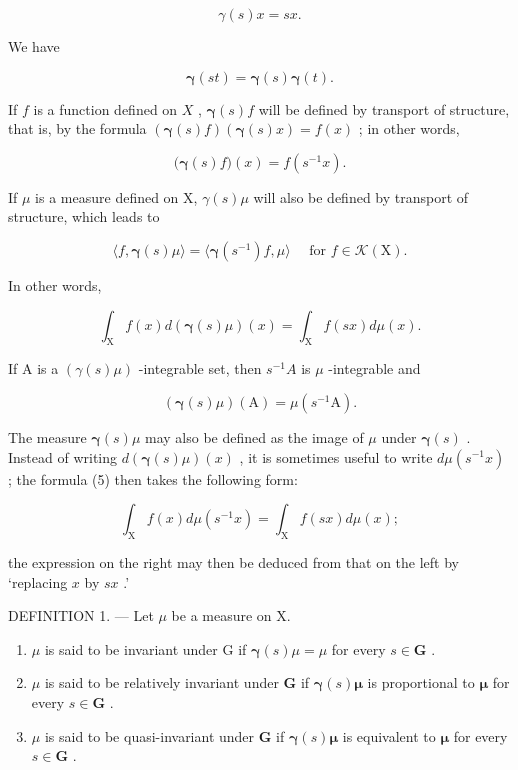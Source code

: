 \[
\gamma (s) x = s x.\tag{1}
\]

We have

\[
\boldsymbol {\gamma} (s t) = \boldsymbol {\gamma} (s) \boldsymbol {\gamma} (t).\tag{2}
\]

If \(f\) is a function defined on \(X\) , \(\boldsymbol{\gamma}(s)f\) will be defined by transport of structure, that is, by the formula \((\boldsymbol{\gamma}(s)f)(\boldsymbol{\gamma}(s)x) = f(x)\) ; in other words,

\[
\big (\boldsymbol {\gamma} (s) f \big) (x) = f (s ^ {- 1} x).\tag{3}
\]

If \(\mu\) is a measure defined on X, \(\gamma(s)\mu\) will also be defined by transport of structure, which leads to

\[
\langle f, \boldsymbol {\gamma} (s) \mu \rangle = \langle \boldsymbol {\gamma} (s ^ {- 1}) f, \mu \rangle \quad \text {   for   } f \in \mathscr {K} (\mathrm{X}).\tag{4}
\]

In other words,

\[
\int_ {\mathrm{X}} f (x) d (\boldsymbol {\gamma} (s) \mu) (x) = \int_ {\mathrm{X}} f (s x) d \mu (x).\tag{5}
\]

If A is a \((\gamma(s)\mu)\) -integrable set, then \(s^{-1}A\) is \(\mu\) -integrable and

\[
\left(\boldsymbol {\gamma} (s) \mu\right) (\mathrm{A}) = \mu \left(s ^ {- 1} \mathrm{A}\right).\tag{6}
\]

The measure \(\boldsymbol{\gamma}(s)\mu\) may also be defined as the image of \(\mu\) under \(\boldsymbol{\gamma}(s)\) . Instead of writing \(d(\boldsymbol{\gamma}(s)\mu)(x)\) , it is sometimes useful to write \(d\mu(s^{-1}x)\) ; the formula (5) then takes the following form:

\[
\int_ {\mathrm{X}} f (x) d \mu (s ^ {- 1} x) = \int_ {\mathrm{X}} f (s x) d \mu (x);
\]

the expression on the right may then be deduced from that on the left by `replacing \(x\) by \(sx\) .'

DEFINITION 1. --- Let \(\mu\) be a measure on X.

\begin{enumerate}
\def\labelenumi{\alph{enumi})}
\item
  \(\mu\) is said to be invariant under G if \(\pmb{\gamma}(s)\mu = \mu\) for every \(s\in \mathbf{G}\) .
\item
  \(\mu\) is said to be relatively invariant under \(\mathbf{G}\) if \(\pmb{\gamma}(s)\pmb{\mu}\) is proportional to \(\pmb{\mu}\) for every \(s\in \mathbf{G}\) .
\item
  \(\mu\) is said to be quasi-invariant under \(\mathbf{G}\) if \(\pmb{\gamma}(s)\pmb{\mu}\) is equivalent to \(\pmb{\mu}\) for every \(s\in \mathbf{G}\) .
\end{enumerate}

